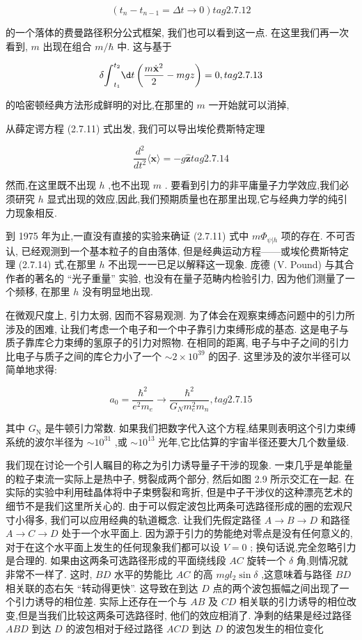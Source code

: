 \documentclass[lang=cn,newtx,10pt,scheme=chinese,thmcnt=section]{elegantbook}
\begin{document}
$$
\left( {{t}_{n} - {t}_{n - 1} = {\Delta t} \rightarrow 0}\right) tag{2.7.12}
$$

的一个落体的费曼路径积分公式框架, 我们也可以看到这一点. 在这里我们再一次看到, $m$ 出现在组合 $m/\hbar$ 中. 这与基于

$$
\delta {\int }_{{t}_{1}}^{{t}_{2}}{\d t}\left( {\frac{m{\dot{\mathbf{x}}}^{2}}{2} - {mgz}}\right) = 0, tag{2.7.13}
$$

的哈密顿经典方法形成鲜明的对比,在那里的 $m$ 一开始就可以消掉,

从薛定谔方程 (2.7.11) 式出发, 我们可以导出埃伦费斯特定理

$$
\frac{{d}^{2}}{d{t}^{2}}\langle \mathbf{x}\rangle = - g\widehat{\mathbf{z}} tag{2. 7.14}
$$

然而,在这里既不出现 $h$ ,也不出现 $m$ . 要看到引力的非平庸量子力学效应,我们必须研究 $h$ 显式出现的效应,因此,我们预期质量也在那里出现,它与经典力学的纯引力现象相反.

到 1975 年为止,一直没有直接的实验来确证 (2.7.11) 式中 $m{\Phi }_{\psi | h}$ 项的存在. 不可否认, 已经观测到一个基本粒子的自由落体, 但是经典运动方程——或埃伦费斯特定理 (2.7.14) 式,在那里 $h$ 不出现一一已足以解释这一现象. 庞德 (V. Pound) 与其合作者的著名的 “光子重量” 实验, 也没有在量子范畴内检验引力, 因为他们测量了一个频移, 在那里 $h$ 没有明显地出现.

在微观尺度上, 引力太弱, 因而不容易观测. 为了体会在观察束缚态问题中的引力所涉及的困难, 让我们考虑一个电子和一个中子靠引力束缚形成的基态. 这是电子与质子靠库仑力束缚的氢原子的引力对照物. 在相同的距离, 电子与中子之间的引力比电子与质子之间的库仑力小了一个 $\sim 2 \times {10}^{39}$ 的因子. 这里涉及的波尔半径可以简单地求得:

$$
{a}_{0} = \frac{{\hbar }^{2}}{{e}^{2}{m}_{e}} \rightarrow \frac{{\hbar }^{2}}{{G}_{N}{m}_{e}^{2}{m}_{n}}, tag{2.7.15}
$$

其中 ${G}_{\mathrm{N}}$ 是牛顿引力常数. 如果我们把数字代入这个方程,结果则表明这个引力束缚系统的波尔半径为 $\sim {10}^{31}$ ,或 $\sim {10}^{13}$ 光年,它比估算的宇宙半径还要大几个数量级.

我们现在讨论一个引人瞩目的称之为引力诱导量子干涉的现象. 一束几乎是单能量的粒子束流一实际上是热中子, 劈裂成两个部分, 然后如图 2.9 所示交汇在一起. 在实际的实验中利用硅晶体将中子束劈裂和弯折, 但是中子干涉仪的这种漂亮艺术的细节不是我们这里所关心的. 由于可以假定波包比两条可选路径形成的圈的宏观尺寸小得多, 我们可以应用经典的轨道概念. 让我们先假定路径 $A \rightarrow B \rightarrow D$ 和路径 $A \rightarrow C \rightarrow D$ 处于一个水平面上. 因为源于引力的势能绝对零点是没有任何意义的, 对于在这个水平面上发生的任何现象我们都可以设 $V = 0$ ; 换句话说,完全忽略引力是合理的. 如果由这两条可选路径形成的平面绕线段 ${AC}$ 旋转一个 $\delta$ 角,则情况就非常不一样了. 这时, ${BD}$ 水平的势能比 ${AC}$ 的高 ${mg}{l}_{2}\sin \delta$ ,这意味着与路径 ${BD}$ 相关联的态右矢 “转动得更快”. 这导致在到达 $D$ 点的两个波包振幅之间出现了一个引力诱导的相位差. 实际上还存在一个与 ${AB}$ 及 ${CD}$ 相关联的引力诱导的相位改变,但是当我们比较这两条可选路径时, 他们的效应相消了. 净剩的结果是经过路径 ${ABD}$ 到达 $D$ 的波包相对于经过路径 ${ACD}$ 到达 $D$ 的波包发生的相位变化
\end{document}
